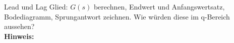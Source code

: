 \begin{question}[section=3,name={Lead und Lag-Glied},difficulty=7,type=mdl,tags={}]
	Lead und Lag Glied: $G(s)$ berechnen, Endwert und Anfangswertsatz, Bodediagramm, Sprungantwort zeichnen. Wie würden diese im q-Bereich aussehen?
	\\ \textbf{Hinweis:}\\
	
\end{question}
\begin{solution}
	
\end{solution}